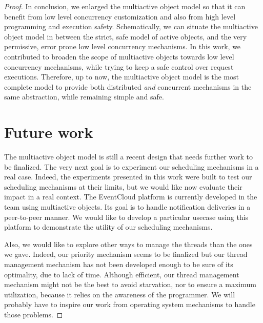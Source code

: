 \documentclass[11pt]{report}
\begin{document}
\begin{proof}
In conclusion, we enlarged the multiactive object model so that it can benefit from low level concurrency customization and also from high level programming and execution safety. Schematically, we can situate the multiactive object model in between the strict, safe model of active objects, and the very permissive, error prone low level concurrency mechanisms. In this work, we contributed to broaden the scope of multiactive objects towards low level concurrency mechanisms, while trying to keep a safe control over request executions. Therefore, up to now, the multiactive object model is the most complete model to provide both distributed \emph{and} concurrent mechanisms in the same abstraction, while remaining simple and safe.



\section{Future work}
The multiactive object model is still a recent design that needs further work to be finalized. The very next goal is to experiment our scheduling mechanisms in a real case. Indeed, the experiments presented in this work were built to test our scheduling mechanisms at their limits, but we would like now evaluate their impact in a real context. The EventCloud platform \cite{ref:eventcloud} is currently developed in the team using multiactive objects. Its goal is to handle notification deliveries in a peer-to-peer manner. We would like to develop a particular usecase using this platform to demonstrate the utility of our scheduling mechanisms. 

Also, we would like to explore other ways to manage the threads than the ones we gave. Indeed, our priority mechanism seems to be finalized but our thread management mechanism has not been developed enough to be sure of its optimality, due to lack of time. Although efficient, our thread management mechanism might not be the best to avoid starvation, nor to ensure a maximum utilization, because it relies on the awareness of the programmer. We will probably have to inspire our work from operating system mechanisms to handle those problems.


\end{proof}
\end{document}
